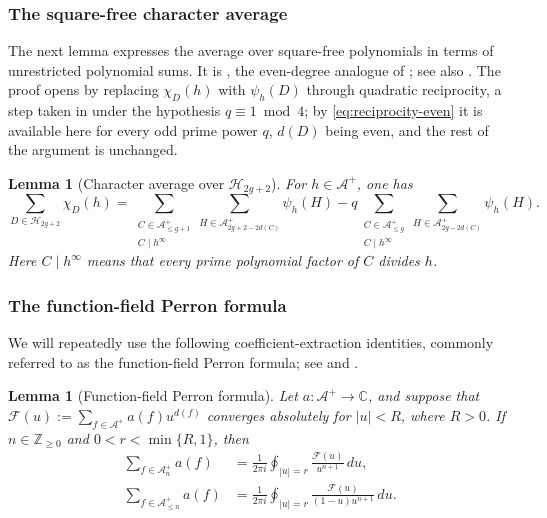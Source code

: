\documentclass[a4paper,reqno]{amsart}
\numberwithin{equation}{section}
\newtheorem{lemma}[theorem]{Lemma}
\theoremstyle{remark}
\theoremstyle{definition}
\newcommand{\A}{\mathcal{A}}
\begin{document}
\subsubsection*{The square-free character average}

The next lemma expresses the average over square-free polynomials in terms
of unrestricted polynomial sums. It is \cite[Lemma~2.2]{Ju20}, the even-degree
analogue of \cite[Lemma~2.2]{Fl17-1}; see also \cite{AM-21}. The proof opens
by replacing $\chi_D(h)$ with $\psi_h(D)$ through quadratic reciprocity, a
step taken in \cite{Fl17-1} under the hypothesis $q\equiv1\bmod4$; by
\eqref{eq:reciprocity-even} it is available here for every odd prime power
$q$, $d(D)$ being even, and the rest of the argument is unchanged.

\begin{lemma}[Character average over $\mathcal H_{2g+2}$]\label{lem:sigma}
For $h\in\A^+$, one has
$$
\sum_{D\in\mathcal H_{2g+2}}\chi_D(h)
=\sum_{\substack{C\in\A^+_{\le g+1}\\ C\mid h^\infty}}\sum_{H\in\A^+_{2g+2-2d(C)}}\psi_h(H)
-q\sum_{\substack{C\in\A^+_{\le g}\\ C\mid h^\infty}}\sum_{H\in\A^+_{2g-2d(C)}}\psi_h(H).
$$
Here $C\mid h^\infty$ means that every prime polynomial factor of $C$ divides $h$.
\end{lemma}

\subsubsection*{The function-field Perron formula}

We will repeatedly use the following coefficient-extraction
identities, commonly referred to as the function-field Perron
formula; see \cite[Lemma~2.8]{AM-21} and
\cite[Fact~3.1]{Ju20}.

\begin{lemma}[Function-field Perron formula]
Let $a:\A^+\to\mathbb C$, and suppose that
$\mathcal F(u) := \sum_{f\in\A^+}a(f)u^{d(f)}$
converges absolutely for $|u|<R$, where $R>0$. If
$n\in\mathbb Z_{\ge0}$ and
$0<r<\min\{R,1\}$, then
\begin{align}
\sum_{f\in\A_n^+}a(f)
&=
\frac{1}{2\pi i}
\oint_{|u|=r}
\frac{\mathcal F(u)}{u^{n+1}}\,du,
\label{eq:perron_exact}\\
\sum_{f\in\A_{\le n}^+}a(f)
&=
\frac{1}{2\pi i}
\oint_{|u|=r}
\frac{\mathcal F(u)}
 {(1-u)u^{n+1}}\,du.
\label{eq:perron_partial}
\end{align}
\end{lemma}
\end{document}
